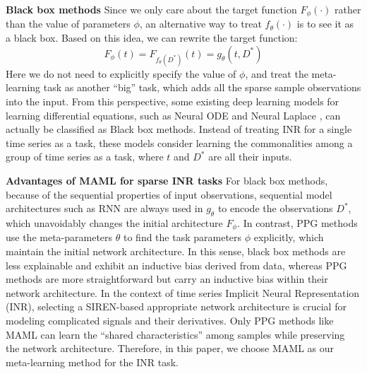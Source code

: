 \documentclass{article}
\begin{document}
\textbf{Black box methods}
Since we only care about the target function $F_\phi(\cdot)$ rather than the value of parameters $\phi$, an alternative way to treat $f_\theta(\cdot)$ is to see it as a black box. Based on this idea, we can rewrite the target function:
$$
F_\phi(t)=F_{f_\theta(D^*)}(t)=g_\theta(t,D^*)
$$
Here we do not need to explicitly specify the value of $\phi$, and treat the meta-learning task as another ``big'' task, which adds all the sparse sample observations into the input.
  From this perspective, some existing deep learning models for learning differential equations, 
  such as Neural ODE \cite{chen2018neural} and Neural Laplace \cite{holt2022neural}, 
  can actually be classified as Black box methods. 
  Instead of treating INR for a single time series as a task, 
  these models consider learning the commonalities among a group of time series as a task, where $t$ and $D^*$ are all their inputs.


\textbf{Advantages of MAML for sparse INR tasks}
For black box methods, because of the sequential properties of input observations, sequential model architectures such as RNN are always used in $g_\theta$ to encode the observations $D^*$, which unavoidably changes the initial architecture $F_\phi$.
In contrast, PPG methods use the meta-parameters $\theta$ to find the task parameters $\phi$ explicitly, which maintain the initial network architecture.
In this sense, black box methods are less explainable and exhibit an inductive bias derived from data, 
whereas PPG methods are more straightforward but carry an inductive bias within their network architecture.
In the context of time series Implicit Neural Representation (INR), selecting a SIREN-based appropriate network architecture is crucial for modeling complicated signals and their derivatives.
Only PPG methods like MAML can learn the ``shared characteristics'' among samples while preserving the network architecture.
Therefore, in this paper, we choose MAML as our meta-learning method for the INR task.
\end{document}
